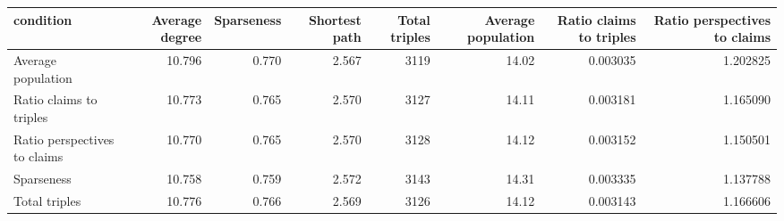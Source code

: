 \begin{tabular}{lrrrrrrr}
\toprule
                   condition &  Average degree &  Sparseness &  Shortest path &  Total triples &  Average population &  Ratio claims to triples &  Ratio perspectives to claims \\
\midrule
          Average population &          10.796 &       0.770 &          2.567 &           3119 &               14.02 &                 0.003035 &                      1.202825 \\
     Ratio claims to triples &          10.773 &       0.765 &          2.570 &           3127 &               14.11 &                 0.003181 &                      1.165090 \\
Ratio perspectives to claims &          10.770 &       0.765 &          2.570 &           3128 &               14.12 &                 0.003152 &                      1.150501 \\
                  Sparseness &          10.758 &       0.759 &          2.572 &           3143 &               14.31 &                 0.003335 &                      1.137788 \\
               Total triples &          10.776 &       0.766 &          2.569 &           3126 &               14.12 &                 0.003143 &                      1.166606 \\
\bottomrule
\end{tabular}
